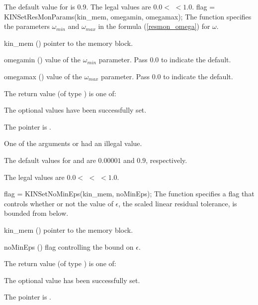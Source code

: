{
  The default value for  is $0.9$.
  The legal values are $0.0 <$  $< 1.0$.
}
{
flag = KINSetResMonParams(kin\_mem, omegamin, omegamax);
}
{
  The function  specifies the parameters $\omega_{min}$ and
  $\omega_{max}$ in the formula (\ref{resmon_omega}) for $\omega$.
}
{
  \begin{args}
  \item[kin\_mem] ()
    pointer to the {\kinsol} memory block.
  \item[omegamin] ()
    value of the $\omega_{min}$ parameter.  Pass $0.0$ to indicate the default.
  \item[omegamax] ()
    value of the $\omega_{max}$ parameter.  Pass $0.0$ to indicate the default.
  \end{args}
}
{
  The return value  (of type ) is one of:
  \begin{args}
  \item[\Id{KIN\_SUCCESS}] 
    The optional values have been successfully set.
  \item[\Id{KIN\_MEM\_NULL}]
    The  pointer is .
  \item[\Id{KIN\_ILL\_INPUT}]
    One of the arguments  or  had an illegal value.
  \end{args}
}
{
  The default values for  and  are $0.00001$ and $0.9$,
  respectively.

  The legal values are $0.0 <$  $<$  $< 1.0$.
}
{
flag = KINSetNoMinEps(kin\_mem, noMinEps);
}
{
  The function  specifies a flag that controls whether or not
  the value of $\epsilon$, the scaled linear residual tolerance, is
  bounded from below.
}
{
  \begin{args}[noMinEps]
  \item[kin\_mem] ()
    pointer to the {\kinsol} memory block.
  \item[noMinEps] ()
    flag controlling the bound on $\epsilon$.
  \end{args}
}
{
  The return value  (of type ) is one of:
  \begin{args}
  \item[\Id{KIN\_SUCCESS}] 
    The optional value has been successfully set.
  \item[\Id{KIN\_MEM\_NULL}]
    The  pointer is .
  \end{args}
}
